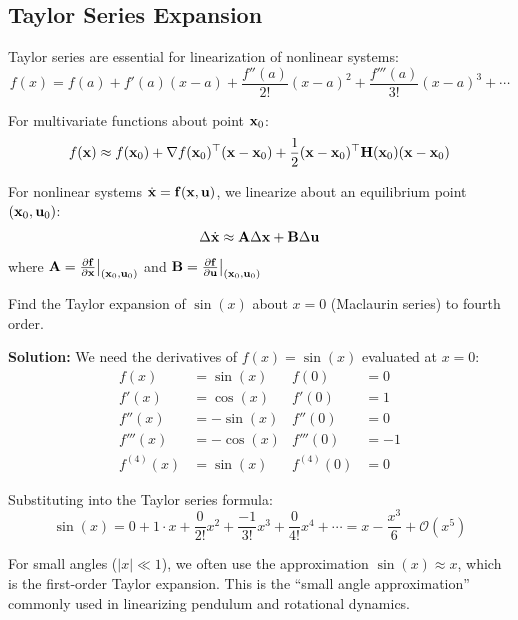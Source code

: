 \subsection{Taylor Series Expansion}

Taylor series are essential for linearization of nonlinear systems:
\begin{equation}
f(x) = f(a) + f'(a)(x-a) + \frac{f''(a)}{2!}(x-a)^2 + \frac{f'''(a)}{3!}(x-a)^3 + \cdots
\end{equation}

For multivariate functions about point $\mathbf{x}_0$:
\begin{equation}
f(\mathbf{x}) \approx f(\mathbf{x}_0) + \nabla f(\mathbf{x}_0)^\top (\mathbf{x} - \mathbf{x}_0) + \frac{1}{2}(\mathbf{x} - \mathbf{x}_0)^\top \mathbf{H}(\mathbf{x}_0) (\mathbf{x} - \mathbf{x}_0)
\end{equation}

\begin{keyconceptbox}[title=Linearization in Control]
For nonlinear systems $\dot{\mathbf{x}} = \mathbf{f}(\mathbf{x}, \mathbf{u})$, we linearize about an equilibrium point $(\mathbf{x}_0, \mathbf{u}_0)$:
\begin{equation}
\Delta\dot{\mathbf{x}} \approx \mathbf{A} \Delta\mathbf{x} + \mathbf{B} \Delta\mathbf{u}
\end{equation}
where $\mathbf{A} = \frac{\partial \mathbf{f}}{\partial \mathbf{x}}\big|_{(\mathbf{x}_0, \mathbf{u}_0)}$ and $\mathbf{B} = \frac{\partial \mathbf{f}}{\partial \mathbf{u}}\big|_{(\mathbf{x}_0, \mathbf{u}_0)}$
\end{keyconceptbox}

\begin{examplebox}[title=Taylor Expansion of Sine Function]
Find the Taylor expansion of $\sin(x)$ about $x = 0$ (Maclaurin series) to fourth order.

\textbf{Solution:} We need the derivatives of $f(x) = \sin(x)$ evaluated at $x = 0$:
\begin{align}
f(x) &= \sin(x) & f(0) &= 0 \\
f'(x) &= \cos(x) & f'(0) &= 1 \\
f''(x) &= -\sin(x) & f''(0) &= 0 \\
f'''(x) &= -\cos(x) & f'''(0) &= -1 \\
f^{(4)}(x) &= \sin(x) & f^{(4)}(0) &= 0
\end{align}

Substituting into the Taylor series formula:
\begin{equation}
\sin(x) = 0 + 1 \cdot x + \frac{0}{2!}x^2 + \frac{-1}{3!}x^3 + \frac{0}{4!}x^4 + \cdots = x - \frac{x^3}{6} + \mathcal{O}(x^5)
\end{equation}

For small angles ($|x| \ll 1$), we often use the approximation $\sin(x) \approx x$, which is the first-order Taylor expansion. This is the ``small angle approximation'' commonly used in linearizing pendulum and rotational dynamics.
\end{examplebox}

